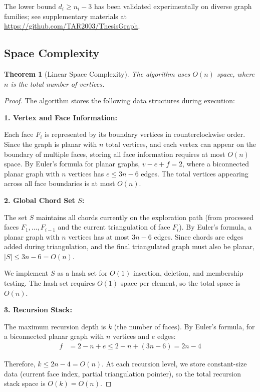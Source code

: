 \documentclass[12pt,a4paper]{article}
\newtheorem{theorem}{Theorem}
\theoremstyle{definition}
\theoremstyle{remark}
\begin{document}
The lower bound $d_i \geq n_i - 3$ has been validated experimentally on diverse graph families; see supplementary materials at \url{https://github.com/TAR2003/ThesisGraph}.

\subsection{Space Complexity}

\begin{theorem}[Linear Space Complexity]
\label{thm:space_complexity}
The algorithm uses $O(n)$ space, where $n$ is the total number of vertices.
\end{theorem}

\begin{proof}
The algorithm stores the following data structures during execution:

\textbf{1. Vertex and Face Information:}

Each face $F_i$ is represented by its boundary vertices in counterclockwise order. Since the graph is planar with $n$ total vertices, and each vertex can appear on the boundary of multiple faces, storing all face information requires at most $O(n)$ space. By Euler's formula for planar graphs, $v - e + f = 2$, where a biconnected planar graph with $n$ vertices has $e \leq 3n - 6$ edges. The total vertices appearing across all face boundaries is at most $O(n)$.

\textbf{2. Global Chord Set $S$:}

The set $S$ maintains all chords currently on the exploration path (from processed faces $F_1, \ldots, F_{i-1}$ and the current triangulation of face $F_i$). By Euler's formula, a planar graph with $n$ vertices has at most $3n - 6$ edges. Since chords are edges added during triangulation, and the final triangulated graph must also be planar, $|S| \leq 3n - 6 = O(n)$.

We implement $S$ as a hash set for $O(1)$ insertion, deletion, and membership testing. The hash set requires $O(1)$ space per element, so the total space is $O(n)$.

\textbf{3. Recursion Stack:}

The maximum recursion depth is $k$ (the number of faces). By Euler's formula, for a biconnected planar graph with $n$ vertices and $e$ edges:
\begin{align*}
f &= 2 - n + e \leq 2 - n + (3n - 6) = 2n - 4
\end{align*}

Therefore, $k \leq 2n - 4 = O(n)$. At each recursion level, we store constant-size data (current face index, partial triangulation pointer), so the total recursion stack space is $O(k) = O(n)$.


\end{proof}
\end{document}

